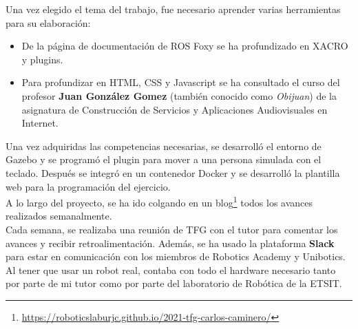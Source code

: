 Una vez elegido el tema del trabajo, fue necesario aprender varias herramientas para su elaboración:
\begin{itemize}
	\item De la página de documentación de ROS Foxy se ha profundizado en XACRO y plugins.
	\item Para profundizar en HTML, CSS y Javascript se ha consultado el curso del profesor \textbf{Juan González Gomez} (también conocido como \textit{Obijuan}) de la asignatura de Construcción de Servicios y Aplicaciones Audiovisuales en Internet.
\end{itemize}

Una vez adquiridas las competencias necesarias, se desarrolló el entorno de Gazebo y se programó el plugin para mover a una persona simulada con el teclado. Después se integró en un contenedor Docker y se desarrolló la plantilla web para la programación del ejercicio.\\

A lo largo del proyecto, se ha ido colgando en un blog\footnote{\url{https://roboticslaburjc.github.io/2021-tfg-carlos-caminero/}} todos los avances realizados semanalmente.\\

Cada semana, se realizaba una reunión de TFG con el tutor para comentar los avances y recibir retroalimentación. Además, se ha usado la plataforma \textbf{Slack} para estar en comunicación con los miembros de Robotics Academy y Unibotics.\\

Al tener que usar un robot real, contaba con todo el hardware necesario tanto por parte de mi tutor como por parte del laboratorio de Robótica de la ETSIT.


